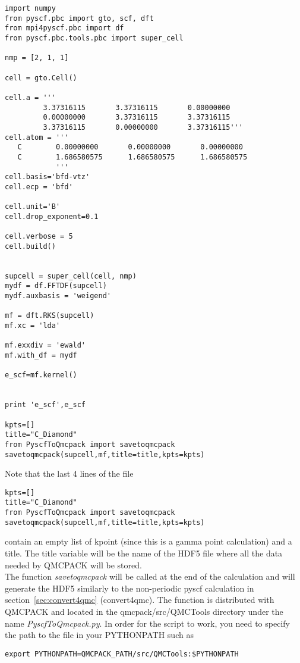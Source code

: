 \begin{itemize}
\begin{lstlisting}[caption=The following is an example PySCF input file for single kpoint calculation for a 2x1x1 Carbon cell.]
import numpy
from pyscf.pbc import gto, scf, dft
from mpi4pyscf.pbc import df 
from pyscf.pbc.tools.pbc import super_cell

nmp = [2, 1, 1]

cell = gto.Cell()

cell.a = '''
         3.37316115       3.37316115       0.00000000
         0.00000000       3.37316115       3.37316115
         3.37316115       0.00000000       3.37316115'''
cell.atom = '''  
   C        0.00000000       0.00000000       0.00000000
   C        1.686580575      1.686580575      1.686580575 
            '''
cell.basis='bfd-vtz'
cell.ecp = 'bfd'

cell.unit='B'
cell.drop_exponent=0.1

cell.verbose = 5
cell.build()


supcell = super_cell(cell, nmp)
mydf = df.FFTDF(supcell)
mydf.auxbasis = 'weigend'

mf = dft.RKS(supcell)
mf.xc = 'lda'

mf.exxdiv = 'ewald'
mf.with_df = mydf

e_scf=mf.kernel()


print 'e_scf',e_scf

kpts=[]
title="C_Diamond"
from PyscfToQmcpack import savetoqmcpack
savetoqmcpack(supcell,mf,title=title,kpts=kpts)

\end{lstlisting}

Note that the last 4 lines of the file
\begin{lstlisting}
kpts=[]
title="C_Diamond"
from PyscfToQmcpack import savetoqmcpack
savetoqmcpack(supcell,mf,title=title,kpts=kpts)
\end{lstlisting}
contain an empty list of kpoint (since this is a gamma point calculation) and a title. The title variable will be the name of the HDF5 file where all the data needed by QMCPACK will be stored. \\
The function \textit{savetoqmcpack} will be called at the end of the calculation and will generate the HDF5 similarly to the non-periodic pyscf calculation in section~\ref{sec:convert4qmc} (convert4qmc). The function is distributed with QMCPACK and located in the qmcpack/src/QMCTools directory under the name \textit{PyscfToQmcpack.py}. In order for the script to work, you need to specify the path to the file in your PYTHONPATH such as

\begin{lstlisting}
export PYTHONPATH=QMCPACK_PATH/src/QMCTools:$PYTHONPATH
\end{lstlisting}



\end{itemize}
